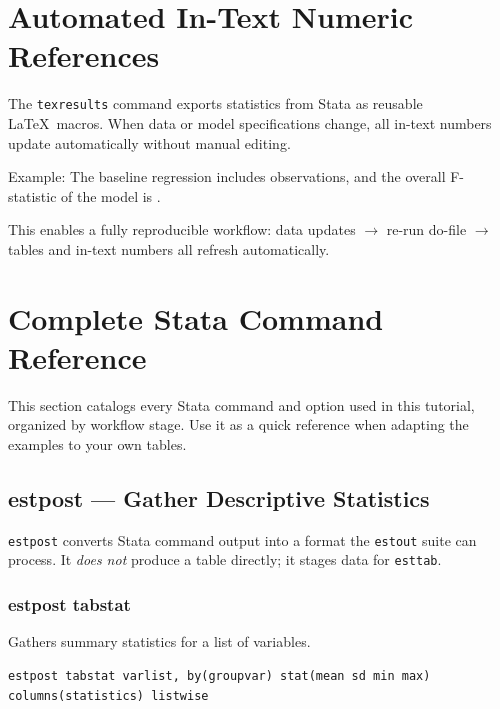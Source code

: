 \documentclass[11pt]{article}
\numberwithin{table}{section}
\begin{document}
\clearpage
\section{Automated In-Text Numeric References}
The \texttt{texresults} command exports statistics from Stata as reusable \LaTeX\ macros. When data or model specifications change, all in-text numbers update automatically without manual editing.

Example: The baseline regression includes \Nreg{} observations, and the overall F-statistic of the model is \Fstat{}.

This enables a fully reproducible workflow: data updates $\rightarrow$ re-run do-file $\rightarrow$ tables and in-text numbers all refresh automatically.

\section{Complete Stata Command Reference}

This section catalogs every Stata command and option used in this tutorial, organized by workflow stage. Use it as a quick reference when adapting the examples to your own tables.

\subsection{estpost --- Gather Descriptive Statistics}

\texttt{estpost} converts Stata command output into a format the \texttt{estout} suite can process. It \emph{does not} produce a table directly; it stages data for \texttt{esttab}.

\subsubsection{estpost tabstat}
Gathers summary statistics for a list of variables.

\begin{lstlisting}[style=stata]
estpost tabstat varlist, by(groupvar) stat(mean sd min max) columns(statistics) listwise
\end{lstlisting}
\end{document}
